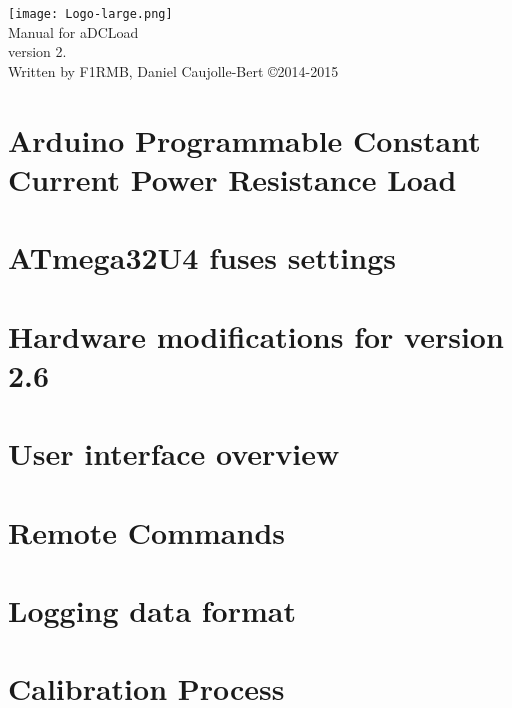 \documentclass[twoside]{book}
\newcommand{\clearemptydoublepage}{%
  \newpage{\pagestyle{empty}\cleardoublepage}%
}
\begin{document}
\hypersetup{pageanchor=false}
\begin{titlepage}
\vspace*{7cm}
\begin{center}%
{\texttt{[image: Logo-large.png]}}\\
\vspace*{0.5cm}
{\Large Manual for a\-D\-C\-Load \\[1ex]\large version 2. }\\
\vspace*{1cm}
{\large Written by F1RMB, Daniel Caujolle-Bert \copyright 2014-2015 }\\
\vspace*{1cm}
\end{center}
\end{titlepage}
\clearemptydoublepage
\tableofcontents
\clearemptydoublepage
{}
\hypersetup{pageanchor=true}

\chapter{Arduino Programmable Constant Current Power Resistance Load}
\label{mainpage}
\hypertarget{mainpage}{}

\chapter{A\-Tmega32\-U4 fuses settings}
\label{fuses}
\hypertarget{fuses}{}

\chapter{Hardware modifications for version 2.6}
\label{mods26}
\hypertarget{mods26}{}

\chapter{User interface overview}
\label{gui}
\hypertarget{gui}{}

\chapter{Remote Commands}
\label{remote}
\hypertarget{remote}{}

\chapter{Logging data format}
\label{logging}
\hypertarget{logging}{}

\chapter{Calibration Process}
\label{calibration}
\hypertarget{calibration}{}

\end{document}
